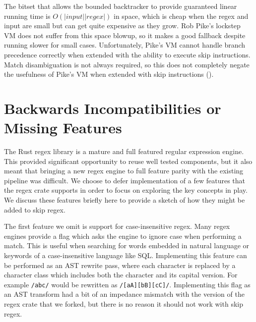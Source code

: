 The bitset that allows the bounded backtracker to provide guaranteed
linear running time is $O(|input||regex|)$ in space, which is
cheap when the regex and input are small but can get quite expensive
as they grow. Rob Pike's lockstep VM does not suffer from this
space blowup, so it makes a good fallback despite running slower
for small cases. Unfortunately, Pike's VM cannot handle branch
precedence correctly when extended with the ability to execute
skip instructions. Match disambiguation is not always required,
so this does not completely negate the usefulness of Pike's VM
when extended with skip instructions (\cite{Pike1987}).

\section{Backwards Incompatibilities or Missing Features}

The Rust regex library is a mature and full featured regular expression
engine. This provided significant opportunity to reuse well tested
components, but it also meant that bringing a new regex engine to
full feature parity with the existing pipeline was difficult. We
choose to defer implementation of a few features that the regex crate
supports in order to focus on exploring the key concepts in play.
We discuss these features briefly here to provide a sketch of how
they might be added to skip regex.

The first feature we omit is support for case-insensitive regex.
Many regex engines provide a flag which asks the engine to ignore
case when performing a match. This is useful when searching for
words embedded in natural language or keywords of a case-insensitive
language like SQL. Implementing this feature can be performed as
an AST rewrite pass, where each character is replaced by a character
class which includes both the character and its capital version.
For example \verb'/abc/' would be rewritten as \verb'/[aA][bB][cC]/'.
Implementing this flag as an AST transform had a bit of an
impedance mismatch with the version of the regex crate that we
forked, but there is no reason it should not work with skip regex.

